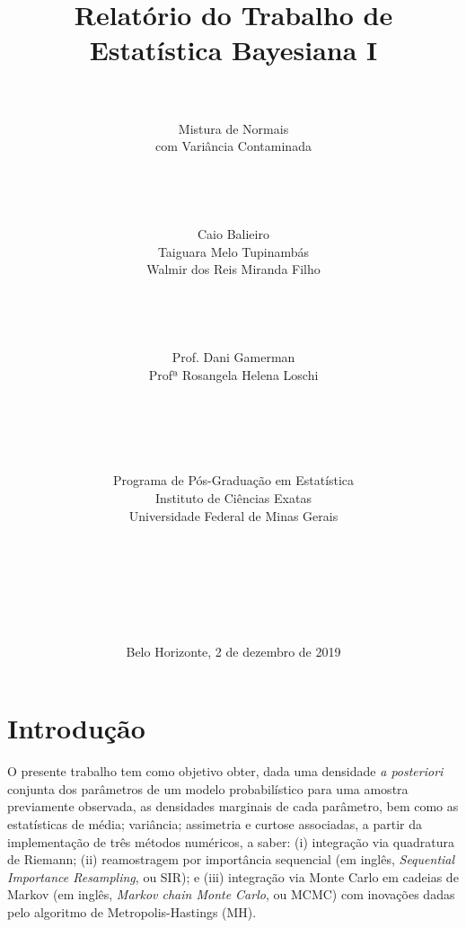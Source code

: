 \documentclass[12pt,reqno,a4paper,oneside]{article}
\begin{document}
\title{\huge Relatório do Trabalho de\\
	Estatística Bayesiana I}
\author{\\
	\\
	\huge Mistura de Normais\\
	\huge com Variância Contaminada\\
	\\
	\\
	\\
	\\
	\Large Caio Balieiro\\
	\Large Taiguara Melo Tupinambás\\
	\Large Walmir dos Reis Miranda Filho\\
	\\
	\\
	\\
	\\
	\Large Prof. Dani Gamerman\\
	\Large Profª Rosangela Helena Loschi\\
	\\
	\\
	\\
	\\
	\\
	Programa de Pós-Graduação em Estatística\\
	Instituto de Ciências Exatas\\
	Universidade Federal de Minas Gerais\\
	\\
	\\
	\\
	\\
	\\
	\\}
\date{Belo Horizonte, 2 de dezembro de 2019}
\maketitle

\newpage

\section{\Large Introdução}

O presente trabalho tem como objetivo obter, dada uma densidade \textit{a posteriori} conjunta dos parâmetros de um modelo probabilístico para uma amostra previamente observada, as densidades marginais de cada parâmetro, bem como as estatísticas de média; variância; assimetria e curtose associadas, a partir da implementação de três métodos numéricos, a saber: (i) integração via quadratura de Riemann; (ii) reamostragem por importância sequencial (em inglês, \textit{Sequential Importance Resampling}, ou SIR); e (iii) integração via Monte Carlo em cadeias de Markov (em inglês, \textit{Markov chain Monte Carlo}, ou MCMC) com inovações dadas pelo algoritmo de Metropolis-Hastings (MH).
\end{document}
